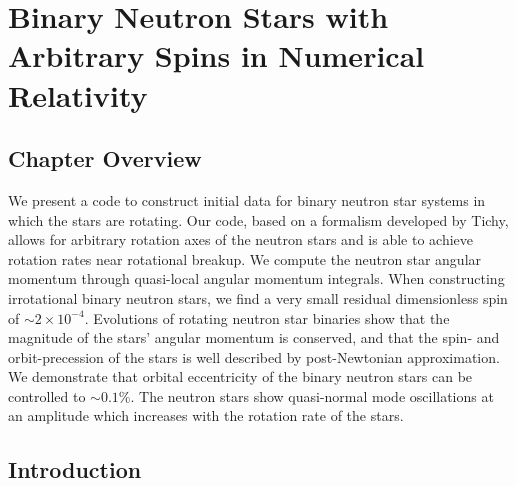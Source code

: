 \chapter{Binary Neutron Stars with Arbitrary Spins in Numerical Relativity}



\section{Chapter Overview}
 We present a code to construct initial data for binary neutron star
  systems in which the stars are rotating.  
  Our code, based on a formalism
  developed by Tichy, allows for arbitrary rotation axes of the
  neutron stars and is able to achieve rotation rates near rotational
  breakup.  We compute the neutron star angular momentum through quasi-local angular momentum
    integrals. When constructing irrotational binary neutron stars, we find a very small residual dimensionless spin of $\sim 2\times 10^{-4}$.  Evolutions of rotating neutron star binaries show that the magnitude of the
    stars' angular momentum is conserved, and that the spin- and
    orbit-precession of the stars is well described by
    post-Newtonian approximation.  We demonstrate that orbital
  eccentricity of the binary neutron stars can be controlled to
  $\sim 0.1\%$.  The neutron stars show
    quasi-normal mode oscillations at an amplitude which increases
    with the rotation rate of the stars.
\section{Introduction}



